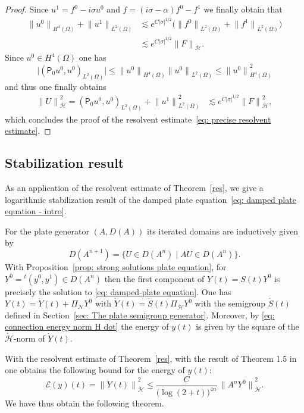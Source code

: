 \documentclass[JEP,XML,SOM,Unicode,published]{cedram}
\let\sep\mid
\theoremstyle{plain}
\theoremstyle{definition}
\newcommand{\inp}[2]{(#1, #2)}
\renewcommand{\H}{{\mathcal H}}
\newcommand{\E}{\ensuremath{\mathcal E}}
\newcommand{\transp}{\ensuremath{\phantom{}^{t}}}
\newcommand{\Norm}[2]{{\| #1 \|}_{#2}}
\newcommand{\Pell}{\mathsf P_0}
\begin{document}
\begin{proof}
Since $u^1=f^0-i\sigma u^0$ and $f=(i\sigma-\alpha)f^0-f^1$ we finally obtain that
\begin{align*}
\Norm{u^0}{H^4(\Omega)}
+\Norm{u^1}{L^2(\Omega)}
&\lesssim e^{C|\sigma|^{1/2}}
\big(\Norm{f^0}{L^2(\Omega)}+\Norm{f^1}{L^2(\Omega)}\big) \\
&\lesssim e^{C|\sigma|^{1/2}} \Norm{F}{\dot \H}.
\end{align*}
Since $u^0 \in H^4(\Omega)$ one has
\begin{equation*}
\big|\inp{\Pell u^0}{u^0}_{L^2(\Omega)}\big|
\leq \Norm{u^0}{H^4(\Omega)}\Norm{u^0}{L^2(\Omega)}
\leq \Norm{u^0}{H^4(\Omega)}^2
\end{equation*}
and thus one finally obtains
\begin{align*}
\Norm{U}{\dot \H}^2 = \inp{\Pell u^0}{u^0}_{L^2(\Omega)}
+\Norm{u^1}{L^2(\Omega)}^2
&\lesssim e^{C|\sigma|^{1/2}} \Norm{F}{\dot \H}^2,
\end{align*}
which concludes the proof of the resolvent estimate~\eqref{eq: precise resolvent estimate}.
\end{proof}

\subsection{Stabilization result}
\label{sec: Stabilization result}
As an application of the resolvent estimate of
Theorem~\ref{res}, we give a logarithmic stabilization result of the damped
plate equation~\eqref{eq: damped plate equation - intro}.

For the plate generator $(A,D(A))$ its iterated domains are
inductively given by
\begin{equation*}
D(A^{n+1}) = \{ U \in D(A^n)\sep A U \in D(A^n)\}.
\end{equation*}
With Proposition~\ref{prop: strong solutions plate equation}, for $Y^0 =\transp(y^0,y^1) \in D(A^n)$ then the first
component of $Y(t) = S(t) Y^0$ is precisely the solution to \eqref{eq:
damped-plate equation}.
One has $Y(t) = \dot{Y}(t) + \Pi_{\mathcal N} Y^0$ with $\dot{Y}(t)
=\dot{S}(t) \Pi_{\dot{\H}} Y^0$ with the semigroup $\dot{S}(t)$
defined in Section~\ref{sec: The plate semigroup generator}. Moreover,
by \eqref{eq: connection energy norm H dot} the energy of $y(t)$ is
given by the square of the $\dot{\H}$-norm of $\dot{Y}(t)$.

With the resolvent estimate of Theorem~\ref{res}, with the result of
Theorem 1.5 in \cite{BD} one obtains the following bound for the
energy of $y(t)$:
\begin{equation}
\label{eq: logarithmic energy decay}
\E(y)(t) = \Norm{\dot{Y} (t) }{\dot{\H}}^2
\leq \frac{C}{\big(\log(2+t)\big)^{4 n}}\,
\Norm{A^n Y^0}{\dot{\H}}^2.
\end{equation}
We have thus obtain the following theorem.
\end{document}
